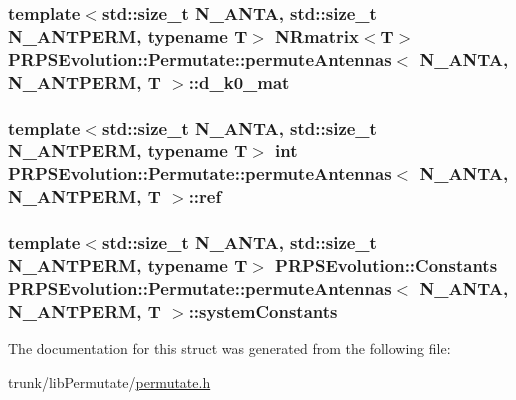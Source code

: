 \hypertarget{struct_p_r_p_s_evolution_1_1_permutate_1_1permute_antennas_a255cd80ec5b4dfb6c2c318df1e052c80}{
\subsubsection[{d\-\_\-k0\-\_\-mat}]{\setlength{\rightskip}{0pt plus 5cm}template$<$std\-::size\-\_\-t \-N\-\_\-\-A\-N\-T\-A, std\-::size\-\_\-t \-N\-\_\-\-A\-N\-T\-P\-E\-R\-M, typename \-T$>$ \-N\-Rmatrix$<$\-T$>$ {\bf \-P\-R\-P\-S\-Evolution\-::\-Permutate\-::permute\-Antennas}$<$ \-N\-\_\-\-A\-N\-T\-A, \-N\-\_\-\-A\-N\-T\-P\-E\-R\-M, \-T $>$\-::{\bf d\-\_\-k0\-\_\-mat}}}\label{struct_p_r_p_s_evolution_1_1_permutate_1_1permute_antennas_a255cd80ec5b4dfb6c2c318df1e052c80}
\hypertarget{struct_p_r_p_s_evolution_1_1_permutate_1_1permute_antennas_a21e29b21d0c2cc612a06857da0127621}{
\subsubsection[{ref}]{\setlength{\rightskip}{0pt plus 5cm}template$<$std\-::size\-\_\-t \-N\-\_\-\-A\-N\-T\-A, std\-::size\-\_\-t \-N\-\_\-\-A\-N\-T\-P\-E\-R\-M, typename \-T$>$ int {\bf \-P\-R\-P\-S\-Evolution\-::\-Permutate\-::permute\-Antennas}$<$ \-N\-\_\-\-A\-N\-T\-A, \-N\-\_\-\-A\-N\-T\-P\-E\-R\-M, \-T $>$\-::{\bf ref}}}\label{struct_p_r_p_s_evolution_1_1_permutate_1_1permute_antennas_a21e29b21d0c2cc612a06857da0127621}
\hypertarget{struct_p_r_p_s_evolution_1_1_permutate_1_1permute_antennas_a85d40e6357f5cff5265a2899392cd865}{
\subsubsection[{system\-Constants}]{\setlength{\rightskip}{0pt plus 5cm}template$<$std\-::size\-\_\-t \-N\-\_\-\-A\-N\-T\-A, std\-::size\-\_\-t \-N\-\_\-\-A\-N\-T\-P\-E\-R\-M, typename \-T$>$ {\bf \-P\-R\-P\-S\-Evolution\-::\-Constants} {\bf \-P\-R\-P\-S\-Evolution\-::\-Permutate\-::permute\-Antennas}$<$ \-N\-\_\-\-A\-N\-T\-A, \-N\-\_\-\-A\-N\-T\-P\-E\-R\-M, \-T $>$\-::{\bf system\-Constants}}}\label{struct_p_r_p_s_evolution_1_1_permutate_1_1permute_antennas_a85d40e6357f5cff5265a2899392cd865}


\-The documentation for this struct was generated from the following file\-:\begin{DoxyCompactItemize}
\item 
trunk/lib\-Permutate/\hyperlink{permutate_8h}{permutate.\-h}\end{DoxyCompactItemize}
